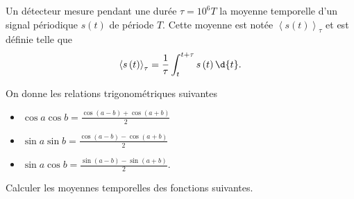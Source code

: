                                 \initialisationPartieGauche %
\begin{minipage}{0.9\linewidth}
Un détecteur mesure pendant une durée $\tau = 10^6 T$ la moyenne temporelle d'un signal périodique $s\left(t \right)$ de période $T$. Cette moyenne est notée $\left< s\left( t \right) \right>_{\tau}$ et est définie telle que
$$
\left< s\left( t \right) \right>_{\tau} = \frac{1}{\tau} \int_t^{t+\tau} s\left( t \right)  \d{t}.
$$
\end{minipage}
								\initialisationPartieDroite %
\begin{minipage}{0.9\linewidth}
On donne les relations trigonométriques suivantes
	\begin{itemize}
		\item $\cos a \cos b = \frac{\cos\left( a-b \right)+\cos\left( a+b \right) }{2}$
		\item $\sin a \sin b = \frac{\cos\left( a-b \right)-\cos\left( a+b \right) }{2}$
		\item $\sin a \cos b = \frac{\sin\left( a-b \right)-\sin\left( a+b \right) }{2}$.
	\end{itemize}
\end{minipage}
\finalisationDuPartageDePage %

Calculer les moyennes temporelles des fonctions suivantes.




